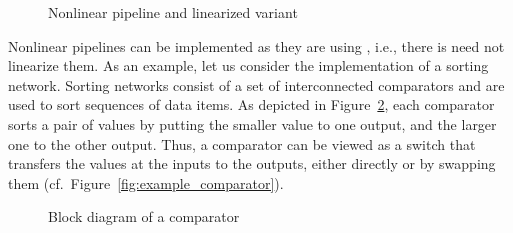 \begin{figure}[!htb]
\centering%
\hspace{1cm}
\caption{Nonlinear pipeline and linearized variant}
\label{fig:linearization}
\end{figure}

Nonlinear pipelines can be implemented as they are using \embb, i.e., there is need not linearize them. As an example, let us consider the implementation of a sorting network. Sorting networks consist of a set of interconnected comparators and are used to sort sequences of data items. As depicted in Figure~\ref{fig:comparator}, each comparator sorts a pair of values by putting the smaller value to one output, and the larger one to the other output. Thus, a comparator can be viewed as a switch that transfers the values at the inputs to the outputs, either directly or by swapping them (cf.~Figure~\ref{fig:example_comparator}).

\begin{figure}[!htb]
\centering%
\caption{Block diagram of a comparator}
\label{fig:comparator}
\end{figure}

